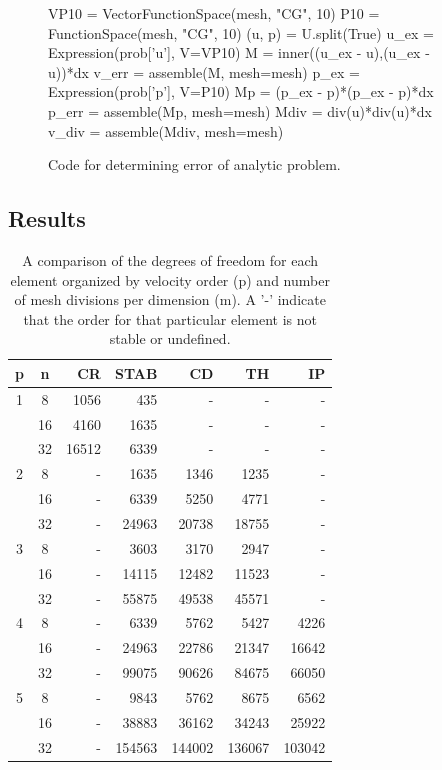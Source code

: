 \begin{figure}
\small
\begin{python}
VP10 = VectorFunctionSpace(mesh, "CG", 10)
P10 = FunctionSpace(mesh, "CG", 10)
(u, p) = U.split(True)
u_ex = Expression(prob['u'], V=VP10)
M = inner((u_ex - u),(u_ex - u))*dx
v_err = assemble(M, mesh=mesh)
p_ex = Expression(prob['p'], V=P10)
Mp = (p_ex - p)*(p_ex - p)*dx
p_err = assemble(Mp, mesh=mesh)
Mdiv = div(u)*div(u)*dx
v_div = assemble(Mdiv, mesh=mesh)
\end{python}
\label{terrel:code:error}
\caption{Code for determining error of analytic problem.}
\end{figure}


\subsection{Results}


\begin{table}
  \centering
  \caption{A comparison of the degrees of freedom for each element organized by
    velocity order (p) and number of mesh divisions per dimension (m). A '-'
    indicate that the order for that particular element is not stable or undefined.}
  \label{terrel:tab:DOFs}
  \medskip
  \small
  \begin{tabular}{|cc|rrrrr|}
    \hline
    p & n & CR &  STAB & CD & TH & IP \\
    \hline
    1&  8 &   1056 &   435 & - & - & -  \\
      & 16 &   4160 & 1635 & - & - & - \\
      & 32 & 16512 & 6339 & - & - & - \\
    \hline
    2 &  8 & - &     1635 &  1346 &   1235 & - \\
       & 16 & - &    6339 &  5250 &   4771 & - \\
       & 32 & - &  24963 & 20738& 18755 & - \\
    \hline
    3 &  8 & - &    3603 &   3170 &   2947 & - \\
       & 16 & - & 14115 & 12482 & 11523 & - \\
       & 32 & - & 55875 & 49538 & 45571 & - \\
    \hline
    4 &  8 & - &    6339 &   5762 &    5427 &   4226 \\
       & 16 & - & 24963 & 22786 &  21347 & 16642 \\
       & 32 & - & 99075 & 90626 &  84675 & 66050 \\
    \hline
    5 &  8 & - &      9843 &     5762 &     8675 &     6562 \\
       & 16 & - &   38883 &   36162 &   34243 &   25922 \\
       & 32 & - & 154563 & 144002 & 136067 & 103042 \\
    \hline
\end{tabular}
\end{table}



